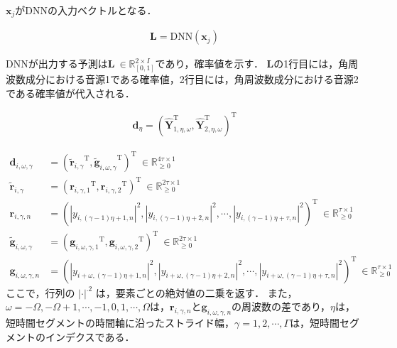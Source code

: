 $\bm{x}_j$がDNNの入力ベクトルとなる．

\begin{align}
    \bm{L} = \mathrm{DNN}(\bm{x}_j)
\end{align}

DNNが出力する予測は$\bm{L} ~\in \mathbb{R}_{[0,1]}^{2 \times I}$であり，確率値を示す．
$\bm{L}$の1行目には，角周波数成分における音源1である確率値，2行目には，角周波数成分における音源2である確率値が代入される．




\begin{align}
    \bm{d}_{\eta} = (\widehat{\bm{Y}}_{1,\eta,\omega}^\mathrm{T},\widehat{\bm{Y}}_{2,\eta,\omega}^\mathrm{T})^\mathrm{T} 
\end{align}


\begin{align}
\bm{d}_{i, \omega, \gamma} &= ({\tilde{\bm{r}}_{i, \gamma}}^\mathrm{T}, {\tilde{\bm{g}}_{i, \omega, \gamma}}^\mathrm{T} )^\mathrm{T}~\in \mathbb{R}_{\geq 0}^{4\tau \times 1} \label{eq:DNNinputVec}\\
\tilde{\bm{r}}_{i,\gamma} &= ({\bm{r}_{i, \gamma, 1}}^\mathrm{T}, {\bm{r}_{i, \gamma, 2}}^\mathrm{T} )^\mathrm{T}~\in \mathbb{R}_{\geq 0}^{2\tau \times 1} \label{eq:DNNinputVecRtilde}\\
\bm{r}_{i, \gamma, n} &= ( |y_{i, (\gamma-1) \eta+1, n}|^2, |y_{i, (\gamma-1) \eta+2, n} |^2, 
\cdots, |y_{i, (\gamma-1) \eta+\tau, n}|^2 )^\mathrm{T}~\in \mathbb{R}_{\geq 0}^{\tau \times 1}  \label{tau1}\\
\tilde{\bm{g}}_{i,\omega,\gamma} &= ({\bm{g}_{i, \omega, \gamma, 1}}^\mathrm{T}, {\bm{g}_{i, \omega, \gamma, 2}}^\mathrm{T} )^\mathrm{T}~\in \mathbb{R}_{\geq 0}^{2\tau \times 1} \label{eq:DNNinputVecGtilde}\\
\bm{g}_{i,\omega, \gamma, n} &= ( |y_{i+\omega, (\gamma-1) \eta+1, n}|^2, |y_{i+\omega, (\gamma-1) \eta+2, n}|^2,\cdots, |y_{i+\omega, (\gamma-1) \eta+\tau, n}|^2 )^\mathrm{T}~\in \mathbb{R}_{\geq 0}^{\tau \times 1} \label{tau2}
\end{align}
ここで，行列の $|\cdot|^{.2}$ は，要素ごとの絶対値の二乗を返す．
また，$\omega=-\Omega, -\Omega+1, \cdots, -1, 0, 1, \cdots, \Omega$は，$\bm{r}_{i,\gamma,n}$と$\bm{g}_{i,\omega,\gamma,n}$の周波数の差であり，$\eta$は，短時間セグメントの時間軸に沿ったストライド幅，$\gamma=1, 2, \cdots, \Gamma$は，短時間セグメントのインデクスである．
